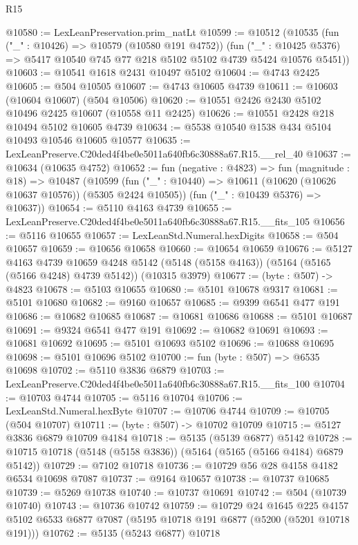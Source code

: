 \begin{lexlean}{R15}
\begin{coremodule}
{{{{{{{{{{{@10580 := LexLeanPreservation.prim_natLt
@10599 := @10512
    (@10535
      (fun ("_" : @10426) => @10579 (@10580 @191 @4752))
      (fun ("_" : @10425 @5376) => @5417 @10540 @745 @77 @218 @5102 @5102 @4739 @5424 @10576 @5451))
@10603 := @10541 @1618 @2431 @10497 @5102
@10604 := @4743 @2425
@10605 := @504 @10505
@10607 := @4743 @10605 @4739
@10611 := @10603 (@10604 @10607) (@504 @10506)
@10620 := @10551 @2426 @2430 @5102 @10496 @2425 @10607 (@10558 @11 @2425)
@10626 := @10551 @2428 @218 @10494 @5102 @10605 @4739
@10634 := @5538 @10540 @1538 @434 @5104 @10493 @10546 @10605 @10577
@10635 := LexLeanPreserve.C20ded4f4be0e5011a640fb6c30888a67.R15.__rel_40
@10637 := @10634 (@10635 @4752)
@10652 := fun (negative : @4823) =>
  fun (magnitude : @18) =>
  @10487
    (@10599
      (fun ("_" : @10440) => @10611 (@10620 (@10626 @10637 @10576)) (@5305 @2424 @10505))
      (fun ("_" : @10439 @5376) => @10637))
@10654 := @5110 @4163 @4739
@10655 := LexLeanPreserve.C20ded4f4be0e5011a640fb6c30888a67.R15.__fits_105
@10656 := @5116 @10655
@10657 := LexLeanStd.Numeral.hexDigits
@10658 := @504 @10657
@10659 := @10656 @10658
@10660 := @10654 @10659
@10676 := @5127
    @4163
    @4739
    @10659
    @4248
    @5142
    (@5148 (@5158 @4163))
    (@5164 (@5165 (@5166 @4248) @4739 @5142))
    (@10315 @3979)
@10677 := (byte : @507) -> @4823
@10678 := @5103 @10655
@10680 := @5101 @10678 @9317
@10681 := @5101 @10680
@10682 := @9160 @10657
@10685 := @9399 @6541 @477 @191
@10686 := @10682 @10685
@10687 := @10681 @10686
@10688 := @5101 @10687
@10691 := @9324 @6541 @477 @191
@10692 := @10682 @10691
@10693 := @10681 @10692
@10695 := @5101 @10693 @5102
@10696 := @10688 @10695
@10698 := @5101 @10696 @5102
@10700 := fun (byte : @507) => @6535 @10698
@10702 := @5110 @3836 @6879
@10703 := LexLeanPreserve.C20ded4f4be0e5011a640fb6c30888a67.R15.__fits_100
@10704 := @10703 @4744
@10705 := @5116 @10704
@10706 := LexLeanStd.Numeral.hexByte
@10707 := @10706 @4744
@10709 := @10705 (@504 @10707)
@10711 := (byte : @507) -> @10702 @10709
@10715 := @5127 @3836 @6879 @10709 @4184
@10718 := @5135 (@5139 @6877) @5142
@10728 := @10715 @10718 (@5148 (@5158 @3836)) (@5164 (@5165 (@5166 @4184) @6879 @5142))
@10729 := @7102 @10718
@10736 := @10729 @56 @28 @4158 @4182 @6534 @10698 @7087
@10737 := @9164 @10657
@10738 := @10737 @10685
@10739 := @5269 @10738
@10740 := @10737 @10691
@10742 := @504 (@10739 @10740)
@10743 := @10736 @10742
@10759 := @10729
    @24
    @1645
    @225
    @4157
    @5102
    @6533
    @6877
    @7087
    (@5195 @10718 @191 @6877 (@5200 (@5201 @10718 @191)))
@10762 := @5135 (@5243 @6877) @10718
}}}}}}}}}}}
\end{coremodule}
\end{lexlean}
